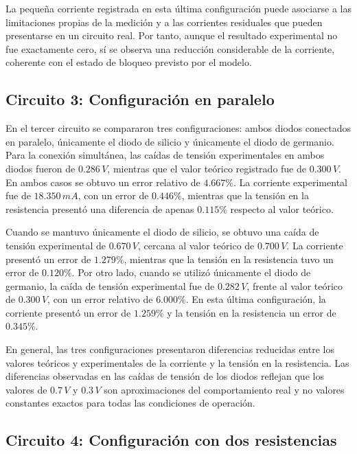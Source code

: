 La pequeña corriente registrada en esta última configuración puede asociarse a las limitaciones propias de la medición y a las corrientes residuales que pueden presentarse en un circuito real. Por tanto, aunque el resultado experimental no fue exactamente cero, sí se observa una reducción considerable de la corriente, coherente con el estado de bloqueo previsto por el modelo.

\subsection{Circuito 3: Configuración en paralelo}

En el tercer circuito se compararon tres configuraciones: ambos diodos conectados en paralelo, únicamente el diodo de silicio y únicamente el diodo de germanio. Para la conexión simultánea, las caídas de tensión experimentales en ambos diodos fueron de \(0.286\,V\), mientras que el valor teórico registrado fue de \(0.300\,V\). En ambos casos se obtuvo un error relativo de \(4.667\%\). La corriente experimental fue de \(18.350\,mA\), con un error de \(0.446\%\), mientras que la tensión en la resistencia presentó una diferencia de apenas \(0.115\%\) respecto al valor teórico.

\vspace{0.3cm}

Cuando se mantuvo únicamente el diodo de silicio, se obtuvo una caída de tensión experimental de \(0.670\,V\), cercana al valor teórico de \(0.700\,V\). La corriente presentó un error de \(1.279\%\), mientras que la tensión en la resistencia tuvo un error de \(0.120\%\). Por otro lado, cuando se utilizó únicamente el diodo de germanio, la caída de tensión experimental fue de \(0.282\,V\), frente al valor teórico de \(0.300\,V\), con un error relativo de \(6.000\%\). En esta última configuración, la corriente presentó un error de \(1.259\%\) y la tensión en la resistencia un error de \(0.345\%\).

\vspace{0.3cm}

En general, las tres configuraciones presentaron diferencias reducidas entre los valores teóricos y experimentales de la corriente y la tensión en la resistencia. Las diferencias observadas en las caídas de tensión de los diodos reflejan que los valores de \(0.7\,V\) y \(0.3\,V\) son aproximaciones del comportamiento real y no valores constantes exactos para todas las condiciones de operación.

\subsection{Circuito 4: Configuración con dos resistencias}

